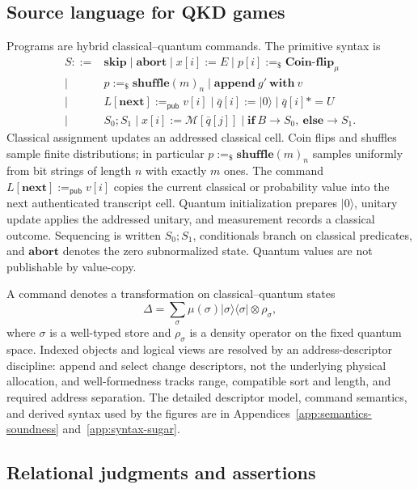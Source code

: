\documentclass[conference,compsoc]{IEEEtran}
\newenvironment{tightdisplay}{%
  \begingroup
  \setlength{\arraycolsep}{2pt}%
  \[
}{%
  \]
  \endgroup
}
\newcommand{\asteq}{\mathrel{*\!=}}
\begin{document}
\subsection{Source language for QKD games}
\label{sec:syntax}

Programs are hybrid classical--quantum commands. The primitive syntax is
\begin{tightdisplay}
\begin{aligned}
S ::= {}& \mathbf{skip}\mid \mathbf{abort}
\mid x[i]:=E
\mid p[i]:=_\$ \mathbf{Coin\mbox{-}flip}_{\mu}\\
\mid{}& p:=_\$\mathbf{shuffle}(m)_n
\mid \mathbf{append}\ g'\ \mathbf{with}\ v\\
\mid{}& L[\mathbf{next}] :=_{\mathsf{pub}} v[i]
\mid \bar q[i]:=|0\rangle
\mid \bar q[i]\asteq U\\
\mid{}& S_0;S_1
\mid x[i]:=\mathcal M[\bar q[j]]
\mid{} \mathbf{if}\ B\rightarrow S_0,\ 
\mathbf{else}\rightarrow S_1 .
\end{aligned}
\end{tightdisplay}
Classical assignment updates an addressed classical cell. Coin flips and shuffles sample finite distributions; in particular \(p:=_\$\mathbf{shuffle}(m)_n\) samples uniformly from bit strings of length \(n\) with exactly \(m\) ones.
The command \(L[\mathbf{next}] :=_{\mathsf{pub}} v[i]\) copies the current
classical or probability value into the next authenticated transcript cell.
Quantum initialization prepares \(|0\rangle\), unitary update applies the
addressed unitary, and measurement records a classical outcome. Sequencing is
written \(S_0;S_1\), conditionals branch on classical predicates, and
\(\mathbf{abort}\) denotes the zero subnormalized state. Quantum values are not
publishable by value-copy.

A command denotes a transformation on classical--quantum states
\[
\Delta=\sum_{\sigma}\mu(\sigma)
|\sigma\rangle\!\langle\sigma|\otimes\rho_\sigma,
\]
where \(\sigma\) is a well-typed store and \(\rho_\sigma\) is a density operator
on the fixed quantum space. Indexed objects and logical views are resolved by an
address-descriptor discipline: append and select change descriptors, not the
underlying physical allocation, and well-formedness tracks range, compatible
sort and length, and required address separation. The detailed descriptor model, command semantics, and derived syntax used by the
figures are in Appendices~\ref{app:semantics-soundness}
and~\ref{app:syntax-sugar}. 


\subsection{Relational judgments and assertions}
\label{sec:logic}
\end{document}
